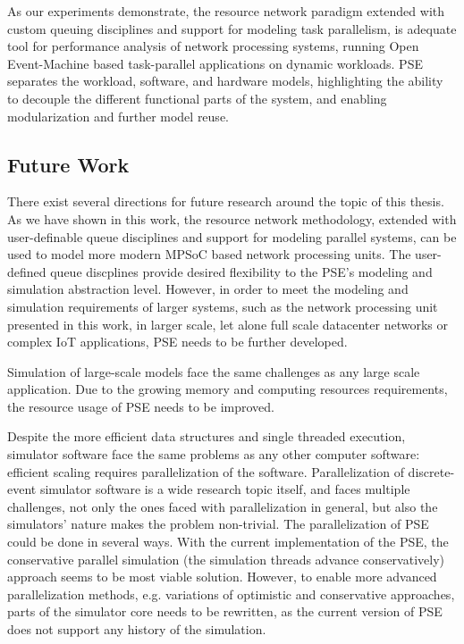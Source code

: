 As our experiments demonstrate, the resource network paradigm extended with custom queuing disciplines and support for modeling task parallelism, is adequate tool for performance analysis of network processing systems, running Open Event-Machine based task-parallel applications on dynamic workloads. PSE separates the workload, software, and hardware models, highlighting the ability to decouple the different functional parts of the system, and enabling modularization and further model reuse.

\subsection{Future Work}
There exist several directions for future research around the topic of this thesis. As we have shown in this work, the resource network methodology, extended with user-definable queue disciplines and support for modeling parallel systems, can be used to model more modern MPSoC based network processing units. The user-defined queue discplines provide desired flexibility to the PSE's modeling and simulation abstraction level. However, in order to meet the modeling and simulation requirements of larger systems, such as the network processing unit presented in this work, in larger scale, let alone full scale datacenter networks or complex IoT applications, PSE needs to be further developed.

Simulation of large-scale models face the same challenges as any large scale application. Due to the growing memory and computing resources requirements, the resource usage of PSE needs to be improved.


Despite the more efficient data structures and single threaded execution, simulator software face the same problems as any other computer software: efficient scaling requires parallelization of the software. Parallelization of discrete-event simulator software is a wide research topic itself, and faces multiple challenges, not only the ones faced with parallelization in general, but also the simulators' nature makes the problem non-trivial. The parallelization of PSE could be done in several ways. With the current implementation of the PSE, the conservative parallel simulation (the simulation threads advance conservatively) approach seems to be most viable solution. However, to enable more advanced parallelization methods, e.g. variations of optimistic and conservative approaches, parts of the simulator core needs to be rewritten, as the current version of PSE does not support any history of the simulation.

